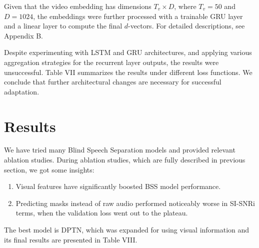 \documentclass[10pt,conference,compsocconf]{IEEEtran}
\begin{document}
Given that the video embedding has dimensions $T_v \times D$, where $T_v = 50$ and $D = 1024$, the embeddings were further processed with a trainable GRU layer and a linear layer to compute the final $d$-vectors. For detailed descriptions, see Appendix B.

Despite experimenting with LSTM and GRU architectures, and applying various aggregation strategies for the recurrent layer outputs, the results were unsuccessful. Table VII summarizes the results under different loss functions. We conclude that further architectural changes are necessary for successful adaptation.

\begin{table}[h!]
\centering
\caption{VoiceFilter training results under different loss functions.}
\end{table}

\section{Results}\label{sec:results}
We have tried many Blind Speech Separation models and provided relevant ablation studies. During ablation studies, which are fully described in previous section, we got some insights:
\begin{enumerate}
    \item Visual features have significantly boosted BSS model performance.
    \item Predicting masks instead of raw audio performed noticeably worse in SI-SNRi terms, when the validation loss went out to the plateau.
\end{enumerate}
The best model is DPTN, which was expanded for using visual information and its final results are presented in Table VIII.
\begin{table}[H]
\centering
\caption{Final best model AV-DPTN results on validation split}
\end{table}
\end{document}

